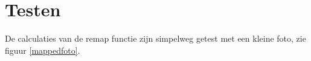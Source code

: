 \section{Testen}
De calculaties van de remap functie zijn simpelweg getest met een kleine foto, zie figuur \ref{mappedfoto}.